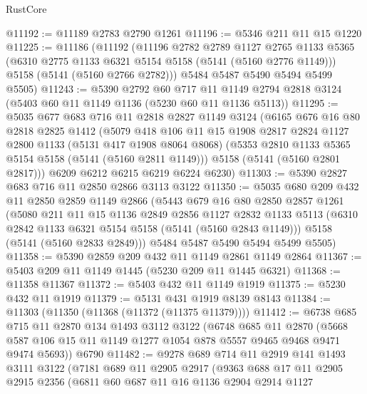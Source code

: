 \begin{lexlean}{RustCore}
\begin{coremodule}
@11192 := @11189 @2783 @2790 @1261
@11196 := @5346 @211 @11 @15 @1220
@11225 := @11186
    (@11192
      (@11196
        @2782
        @2789
        @1127
        @2765
        @1133
        @5365
        (@6310 @2775 @1133 @6321 @5154 @5158 (@5141 (@5160 @2776 @1149)))
        @5158
        (@5141 (@5160 @2766 @2782)))
      @5484
      @5487
      @5490
      @5494
      @5499
      @5505)
@11243 := @5390
    @2792
    @60
    @717
    @11
    @1149
    @2794
    @2818
    @3124
    (@5403 @60 @11 @1149 @1136 (@5230 @60 @11 @1136 @5113))
@11295 := @5035
    @677
    @683
    @716
    @11
    @2818
    @2827
    @1149
    @3124
    (@6165
      @676
      @16
      @80
      @2818
      @2825
      @1412
      (@5079
        @418
        @106
        @11
        @15
        @1908
        @2817
        @2824
        @1127
        @2800
        @1133
        (@5131 @417 @1908 @8064 @8068)
        (@5353 @2810 @1133 @5365 @5154 @5158 (@5141 (@5160 @2811 @1149)))
        @5158
        (@5141 (@5160 @2801 @2817)))
      @6209
      @6212
      @6215
      @6219
      @6224
      @6230)
@11303 := @5390 @2827 @683 @716 @11 @2850 @2866 @3113 @3122
@11350 := @5035
    @680
    @209
    @432
    @11
    @2850
    @2859
    @1149
    @2866
    (@5443
      @679
      @16
      @80
      @2850
      @2857
      @1261
      (@5080
        @211
        @11
        @15
        @1136
        @2849
        @2856
        @1127
        @2832
        @1133
        @5113
        (@6310 @2842 @1133 @6321 @5154 @5158 (@5141 (@5160 @2843 @1149)))
        @5158
        (@5141 (@5160 @2833 @2849)))
      @5484
      @5487
      @5490
      @5494
      @5499
      @5505)
@11358 := @5390 @2859 @209 @432 @11 @1149 @2861 @1149 @2864
@11367 := @5403 @209 @11 @1149 @1445 (@5230 @209 @11 @1445 @6321)
@11368 := @11358 @11367
@11372 := @5403 @432 @11 @1149 @1919
@11375 := @5230 @432 @11 @1919
@11379 := @5131 @431 @1919 @8139 @8143
@11384 := @11303 (@11350 (@11368 (@11372 (@11375 @11379))))
@11412 := @6738
    @685
    @715
    @11
    @2870
    @134
    @1493
    @3112
    @3122
    (@6748
      @685
      @11
      @2870
      (@5668 @587 @106 @15 @11 @1149 @1277 @1054 @878 @5557 @9465 @9468 @9471 @9474 @5693))
    @6790
@11482 := @9278
    @689
    @714
    @11
    @2919
    @141
    @1493
    @3111
    @3122
    (@7181
      @689
      @11
      @2905
      @2917
      (@9363
        @688
        @17
        @11
        @2905
        @2915
        @2356
        (@6811
          @60
          @687
          @11
          @16
          @1136
          @2904
          @2914
          @1127

\end{coremodule}
\end{lexlean}
